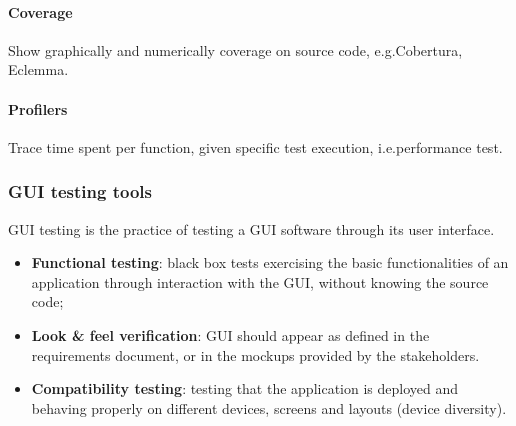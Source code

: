 \paragraph{Coverage}
Show graphically and numerically coverage on source code, e.g.\@ Cobertura, Eclemma.

\paragraph{Profilers}
Trace time spent per function, given specific test execution, i.e.\@ performance test.

\subsubsection{GUI testing tools}
GUI testing is the practice of testing a GUI software through its user interface.
\begin{itemize}
\item \textbf{Functional testing}: black box tests exercising the basic functionalities of an application through interaction with the GUI, without knowing the source code;
\item \textbf{Look \& feel verification}: GUI should appear as defined in the requirements document, or in the mockups provided by the stakeholders.
\item \textbf{Compatibility testing}: testing that the application is deployed and behaving properly on different devices, screens and layouts (device diversity).
\end{itemize}

